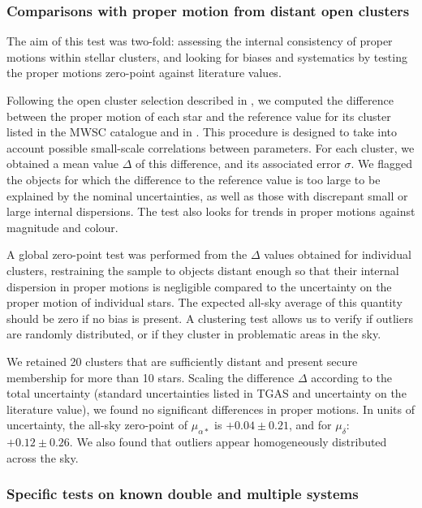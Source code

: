 \subsubsection{Comparisons with proper motion from distant open clusters}\label{sssec:cu9val_ocpm}
The aim of this test was two-fold: assessing the internal consistency of proper motions within stellar clusters, and looking for biases and systematics by testing the proper motions zero-point against literature values.

Following the open cluster selection described in , we computed the difference between the proper motion of each star and the reference value for its cluster listed in the MWSC catalogue \citep{2013A&A...558A..53K} and in \citet{2014A&A...564A..79D}. This procedure is designed to take into account possible small-scale correlations between parameters.
For each cluster, we obtained a mean value $\Delta$ of this difference, and its associated error $\sigma$. We flagged the objects for which the difference to the reference value is too large to be explained by the nominal uncertainties, as well as those with discrepant small or large internal dispersions. The test also looks for trends in proper motions against magnitude and colour.

A global zero-point test was performed from the $\Delta$ values obtained for individual clusters, restraining the sample to objects distant enough so that their internal dispersion in proper motions is negligible compared to the uncertainty on the proper motion of individual stars. The expected all-sky average of this quantity should be zero if no bias is present. A clustering test allows us to verify if outliers are randomly distributed, or if they cluster in problematic areas in the sky.

We retained 20 clusters that are sufficiently distant and present secure membership for more than 10 stars.
Scaling the difference $\Delta$ according to the total uncertainty (standard uncertainties listed in TGAS and uncertainty on the literature value), we found no significant differences in proper motions. In units of uncertainty, the all-sky zero-point of $\mu_{\alpha *}$ is $+0.04\pm0.21$, and for $\mu_{\delta}$: $+0.12\pm0.26$. We also found that outliers appear homogeneously distributed across the sky.


\subsubsection{Specific tests on known double and multiple systems} 

